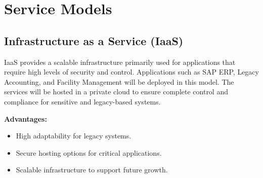 \section{Service Models}

\subsection{Infrastructure as a Service (IaaS)} 
IaaS provides a scalable infrastructure primarily used for applications that require high levels of security and control. Applications such as SAP ERP, Legacy Accounting, and Facility Management will be deployed in this model. The services will be hosted in a private cloud to ensure complete control and compliance for sensitive and legacy-based systems.

\textbf{Advantages:}
\begin{itemize}
    \item High adaptability for legacy systems.
    \item Secure hosting options for critical applications.
    \item Scalable infrastructure to support future growth.
\end{itemize}
